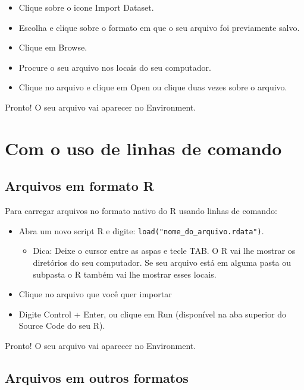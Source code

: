 \documentclass[
  10pt,
  brazil,
  a4paper,
  twoside, notitlepage, openright]{book}
\providecommand{\tightlist}{%
  \setlength{\itemsep}{0pt}\setlength{\parskip}{0pt}}
\begin{document}
\begin{itemize}
\tightlist
\item
  Clique sobre o icone Import Dataset.
\item
  Escolha e clique sobre o formato em que o seu arquivo foi previamente salvo.
\item
  Clique em Browse.
\item
  Procure o seu arquivo nos locais do seu computador.
\item
  Clique no arquivo e clique em Open ou clique duas vezes sobre o arquivo.
\end{itemize}

Pronto! O seu arquivo vai aparecer no Environment.

\hypertarget{com-o-uso-de-linhas-de-comando}{%
\section{Com o uso de linhas de comando}\label{com-o-uso-de-linhas-de-comando}}

\hypertarget{arquivos-em-formato-r-1}{%
\subsection{Arquivos em formato R}\label{arquivos-em-formato-r-1}}

Para carregar arquivos no formato nativo do R usando linhas de comando:

\begin{itemize}
\tightlist
\item
  Abra um novo script R e digite: \texttt{load("nome\_do\_arquivo.rdata")}.

  \begin{itemize}
  \tightlist
  \item
    Dica: Deixe o cursor entre as aspas e tecle TAB. O R vai lhe mostrar os diretórios do seu computador. Se seu arquivo está em alguma pasta ou subpasta o R também vai lhe mostrar esses locais.
  \end{itemize}
\item
  Clique no arquivo que você quer importar
\item
  Digite Control + Enter, ou clique em Run (disponível na aba superior do Source Code do seu R).
\end{itemize}

Pronto! O seu arquivo vai aparecer no Environment.

\hypertarget{arquivos-em-outros-formatos-1}{%
\subsection{Arquivos em outros formatos}\label{arquivos-em-outros-formatos-1}}
\end{document}
